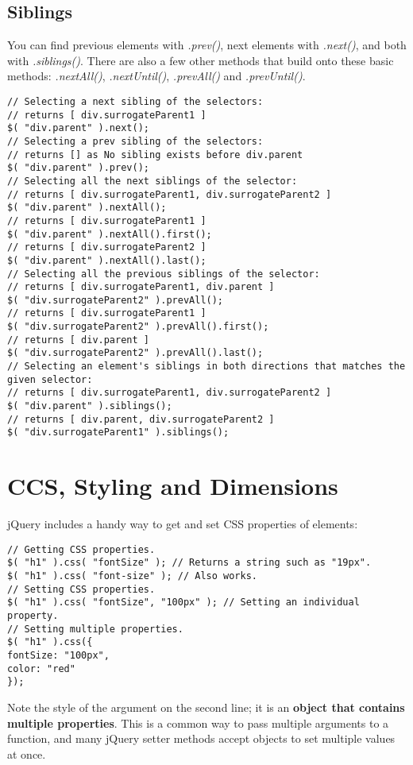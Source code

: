 \documentclass[10pt,letterpaper]{book}
\begin{document}
\subsection{Siblings}
You can find previous elements with \textit{.prev()}, next elements with \textit{.next()}, and both with \textit{.siblings()}. There are also a few other methods that build onto these basic methods: \textit{.nextAll()}, \textit{.nextUntil()}, \textit{.prevAll()} and \textit{.prevUntil()}.
\begin{lstlisting}
// Selecting a next sibling of the selectors:
// returns [ div.surrogateParent1 ]
$( "div.parent" ).next();
// Selecting a prev sibling of the selectors:
// returns [] as No sibling exists before div.parent
$( "div.parent" ).prev();
// Selecting all the next siblings of the selector:
// returns [ div.surrogateParent1, div.surrogateParent2 ]
$( "div.parent" ).nextAll();
// returns [ div.surrogateParent1 ]
$( "div.parent" ).nextAll().first();
// returns [ div.surrogateParent2 ]
$( "div.parent" ).nextAll().last();
// Selecting all the previous siblings of the selector:
// returns [ div.surrogateParent1, div.parent ]
$( "div.surrogateParent2" ).prevAll();
// returns [ div.surrogateParent1 ]
$( "div.surrogateParent2" ).prevAll().first();
// returns [ div.parent ]
$( "div.surrogateParent2" ).prevAll().last();
// Selecting an element's siblings in both directions that matches the given selector:
// returns [ div.surrogateParent1, div.surrogateParent2 ]
$( "div.parent" ).siblings();
// returns [ div.parent, div.surrogateParent2 ]
$( "div.surrogateParent1" ).siblings();
\end{lstlisting}
\section{CCS, Styling and Dimensions}
jQuery includes a handy way to get and set CSS properties of elements:
\begin{lstlisting}
// Getting CSS properties.
$( "h1" ).css( "fontSize" ); // Returns a string such as "19px".
$( "h1" ).css( "font-size" ); // Also works.
// Setting CSS properties.
$( "h1" ).css( "fontSize", "100px" ); // Setting an individual property.
// Setting multiple properties.
$( "h1" ).css({
fontSize: "100px",
color: "red"
});
\end{lstlisting}
Note the style of the argument on the second line; it is an \textbf{object that contains multiple properties}. This is a common way to pass multiple arguments to a function, and many jQuery setter methods accept objects to set multiple values at once.
\end{document}
